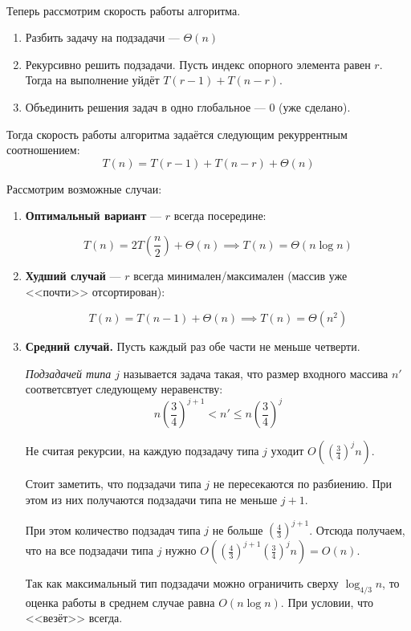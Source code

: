 \documentclass[12pt, a4paper]{article}
\begin{document}
\

Теперь рассмотрим скорость работы алгоритма.

\begin{enumerate}
    \item Разбить задачу на подзадачи --- $\Theta(n)$
    \item Рекурсивно решить подзадачи. Пусть индекс опорного элемента равен $r$. Тогда на выполнение уйдёт $T(r-1) + T(n-r)$.
    \item Объединить решения задач в одно глобальное --- $0$ (уже сделано).
\end{enumerate}

Тогда скорость работы алгоритма задаётся следующим рекуррентным соотношением:
\[T(n) = T(r-1) + T(n-r) + \Theta(n)\]

Рассмотрим возможные случаи:

\begin{enumerate}
	\item \textbf{Оптимальный вариант} --- $r$ всегда посередине:
	
	\[T(n) = 2T\left(\frac{n}{2}\right) + \Theta(n) \implies T(n) = \Theta(n\log n)\]
	
	\item \textbf{Худший случай} --- $r$ всегда минимален/максимален (массив уже <<почти>> отсортирован):
	
	\[T(n) = T(n-1) + \Theta(n) \implies T(n) = \Theta(n^2)\]
	
	\item \textbf{Средний случай.} Пусть каждый раз обе части не меньше четверти.
	
	\emph{Подзадачей типа $j$} называется задача такая, что размер входного массива $n'$ соответсвтует следующему неравенству:
	\[n\left(\frac{3}{4}\right)^{j+1} < n' \leqslant n\left(\frac{3}{4}\right)^{j}\]
	
	Не считая рекурсии, на каждую подзадачу типа $j$ уходит $O\left(\left(\frac{3}{4}\right)^{j}n\right)$.
	
	Стоит заметить, что подзадачи типа $j$ не пересекаются по разбиению. При этом из них получаются подзадачи типа не меньше $j+1$.
	
	При этом количество подзадач типа $j$ не больше $\left(\frac{4}{3}\right)^{j+1}$. Отсюда получаем, что на все подзадачи типа $j$ нужно $O\left(\left(\frac{4}{3}\right)^{j+1}\left(\frac{3}{4}\right)^{j}n\right) = O(n)$.
	
	Так как максимальный тип подзадачи можно ограничить сверху $\log_{4/3} n$, то оценка работы в среднем случае равна $O(n \log n)$. При условии, что <<везёт>> всегда.
\end{enumerate}
\end{document}
